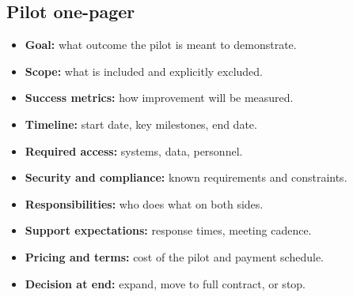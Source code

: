 \documentclass[10pt, a4paper, twocolumn]{article} %
\begin{document}
\subsection*{Pilot one-pager}

\begin{itemize}
  \item \textbf{Goal:} what outcome the pilot is meant to demonstrate.
  \item \textbf{Scope:} what is included and explicitly excluded.
  \item \textbf{Success metrics:} how improvement will be measured.
  \item \textbf{Timeline:} start date, key milestones, end date.
  \item \textbf{Required access:} systems, data, personnel.
  \item \textbf{Security and compliance:} known requirements and constraints.
  \item \textbf{Responsibilities:} who does what on both sides.
  \item \textbf{Support expectations:} response times, meeting cadence.
  \item \textbf{Pricing and terms:} cost of the pilot and payment schedule.
  \item \textbf{Decision at end:} expand, move to full contract, or stop.
\end{itemize}

\vspace*{\fill}

\printbibliography
\end{document}
